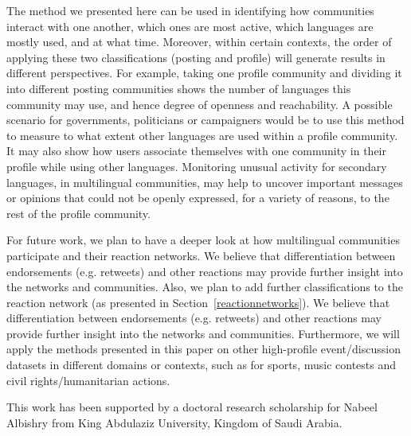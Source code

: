 The method we presented here can be used in identifying how
communities interact with one another, which ones are most active,
which languages are mostly used, and at what time. Moreover, within
certain contexts, the order of applying these two classifications
(posting and profile) will generate results in different
perspectives. For example, taking one profile community and dividing
it into different posting communities shows the number of languages
this community may use, and hence degree of openness and
reachability. A possible scenario for governments, politicians or
campaigners would be to use this method to measure to what extent
other languages are used within a profile community. It may also show
how users associate themselves with one community in their profile
while using other languages. Monitoring unusual activity for secondary
languages, in multilingual communities, may help to uncover important
messages or opinions that could not be openly expressed, for a variety
of reasons, to the rest of the profile community.

For future work, we plan to have a deeper look at how multilingual
communities participate and their reaction networks. We believe that
differentiation between endorsements (e.g. retweets) and other
reactions may provide further insight into the networks and
communities. Also, we plan to add further classifications to the
reaction network (as presented in Section~\ref{reactionnetworks}). We
believe that differentiation between endorsements (e.g. retweets) and
other reactions may provide further insight into the networks and
communities. Furthermore, we will apply the methods presented in this
paper on other high-profile event/discussion datasets in different
domains or contexts, such as for sports, music contests and civil
rights/humanitarian actions.





\begin{acks}
This work has been supported by a doctoral research scholarship for
Nabeel Albishry from King Abdulaziz University, Kingdom of Saudi
Arabia.
\end{acks}
